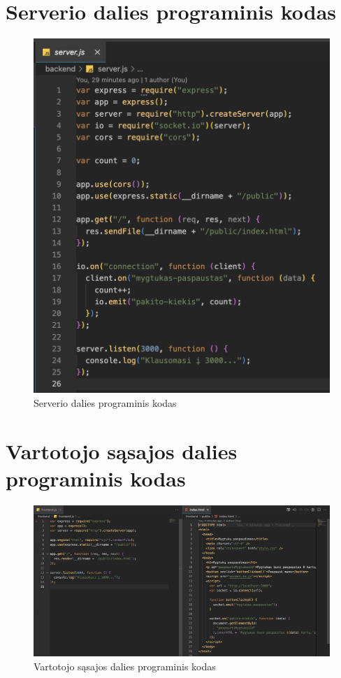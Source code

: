 \documentclass{VUMIFPSkursinis}
\begin{document}
\section{Serverio dalies programinis kodas}
\label{priedas1}
\begin{figure}[H]
    \centering
    \includegraphics[scale=0.7]{img/priedai/backend-kodas.png}
    \caption{Serverio dalies programinis kodas}
    \label{img:mlp}
\end{figure}


\section{Vartotojo sąsajos dalies programinis kodas}
\label{priedas2}
\begin{figure}[H]
    \centering
    \includegraphics[scale=0.45]{img/priedai/frontend-kodas.png}
    \caption{Vartotojo sąsajos dalies programinis kodas}
    \label{img:mlp}
\end{figure}
\end{document}
